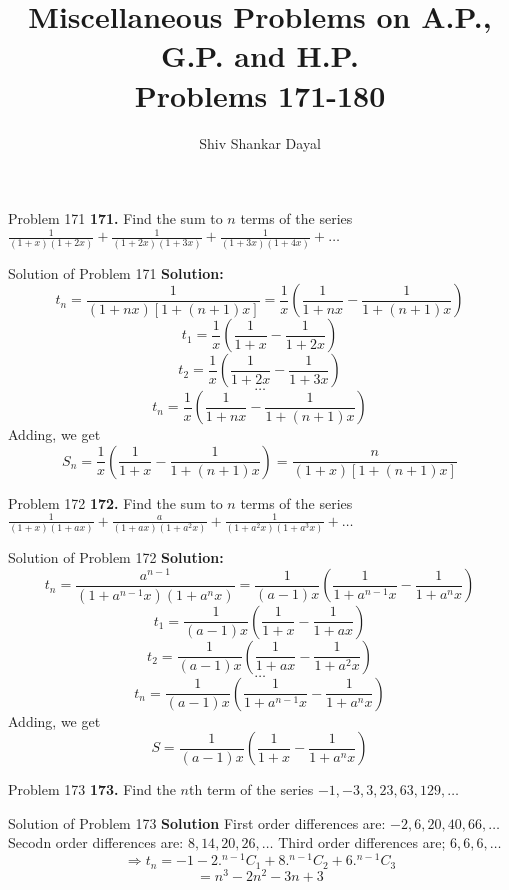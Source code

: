 \documentclass[aspectratio=1610,8pt]{beamer}
\title{Miscellaneous Problems on A.P., G.P. and H.P.\\Problems 171-180}
\author[Shiv Shankar Dayal]{Shiv Shankar Dayal}
\begin{document}
\begin{frame}
  \titlepage
\end{frame}
\begin{frame}{Problem 171}
  \textbf{171.} Find the sum to $n$ terms of the series $\frac{1}{(1 + x)(1 + 2x)} + \frac{1}{(1 + 2x)(1 + 3x)} + \frac{1}{(1 +
    3x)(1 + 4x)} + \ldots$
\end{frame}
\begin{frame}{Solution of Problem 171}
  \textbf{Solution:} $$t_n = \frac{1}{(1 + nx)[1 + (n + 1)x]} = \frac{1}{x}\left(\frac{1}{1 + nx} - \frac{1}{1 + (n + 1)x}\right)$$
  $$t_1 = \frac{1}{x}\left(\frac{1}{1 + x} - \frac{1}{1 + 2x}\right)$$
  $$t_2 = \frac{1}{x}\left(\frac{1}{1 + 2x} - \frac{1}{1 + 3x}\right)$$
  $$\ldots$$
  $$t_n = \frac{1}{x}\left(\frac{1}{1 + nx} - \frac{1}{1 + (n + 1)x}\right)$$
  Adding, we get
  $$S_n = \frac{1}{x}\left(\frac{1}{1 + x} - \frac{1}{1 + (n + 1)x}\right) = \frac{n}{(1 + x)[1 + (n + 1)x]}$$
\end{frame}
\begin{frame}{Problem 172}
  \textbf{172.} Find the sum to $n$ terms of the series $\frac{1}{(1 + x)(1 + ax)} + \frac{a}{(1 + ax)(1 + a^2x)} + \frac{1}{(1 +
    a^2x)(1 + a^3x)} + \ldots$
\end{frame}
\begin{frame}{Solution of Problem 172}
  \textbf{Solution:} $$t_n = \frac{a^{n - 1}}{(1 + a^{n - 1}x)(1 + a^nx)} = \frac{1}{(a - 1)x}\left(\frac{1}{1 + a^{n - 1}x} -
  \frac{1}{1 + a^nx}\right)$$
  $$t_1 = \frac{1}{(a - 1)x}\left(\frac{1}{1 + x} - \frac{1}{1 + ax}\right)$$
  $$t_2 = \frac{1}{(a - 1)x}\left(\frac{1}{1 + ax} - \frac{1}{1 + a^2x}\right)$$
  $$\ldots$$
  $$t_n = \frac{1}{(a - 1)x}\left(\frac{1}{1 + a^{n - 1}x} - \frac{1}{1 + a^nx}\right)$$
  Adding, we get
  $$S = \frac{1}{(a - 1)x}\left(\frac{1}{1 + x} - \frac{1}{1 + a^n x}\right)$$
\end{frame}
\begin{frame}{Problem 173}
  \textbf{173.} Find the $n$th term of the series $-1, -3, 3, 23, 63, 129, \ldots$
\end{frame}
\begin{frame}{Solution of Problem 173}
  \textbf{Solution} First order differences are: $-2, 6, 20, 40, 66, \ldots$
  \linebreak\linebreak
  Secodn order differences are: $8, 14, 20, 26, \ldots$
  \linebreak\linebreak
  Third order differences are; $6, 6, 6, \ldots$
  \linebreak\linebreak
  $$\Rightarrow t_n = -1 -2.{}^{n- 1}C_1 + 8.{}^{n - 1}C_2 + 6.{}^{n - 1}C_3$$
  $$= n^3 - 2n^2 - 3n + 3$$
\end{frame}
\end{document}
